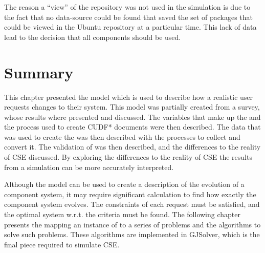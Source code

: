 The reason a ``view'' of the repository was not used in the simulation is due to the fact that no data-source could be found 
that saved the set of packages that could be viewed in the Ubuntu repository at a particular time.
This lack of data lead to the decision that all components should be used.

\section{Summary}
This chapter presented the \usermodel model which is used to describe how a realistic user requests changes to their system.
This model was partially created from a survey, whose results where presented and discussed.
The variables that make up the \usermodel and the process used to create CUDF* documents were then described.
The data that was used to create the \usermodel was then described with the processes to collect and convert it.
The validation of \usermodel was then described, and the differences to the reality of CSE discussed.
By exploring the differences to the reality of CSE the results from a simulation can be more accurately interpreted.

Although the \usermodel model can be used to create a description of the evolution of a component system, it may require significant calculation to find how exactly the component system evolves.
The constraints of each request must be satisfied, and the optimal system w.r.t. the criteria must be found.
The following chapter presents the mapping an instance of \modelname to a series of problems and the algorithms to solve such problems.
These algorithms are implemented in GJSolver, which is the final piece required to simulate CSE.

